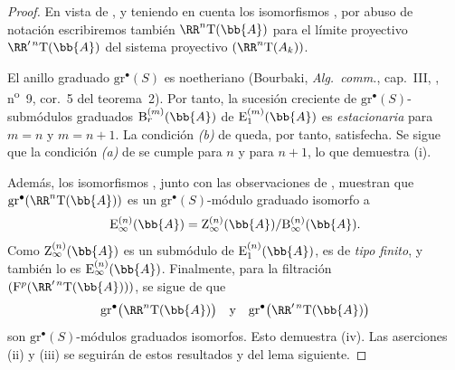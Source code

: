 \documentclass[oneside]{amsart}
\begin{document}
\begin{proof}
En vista de , y teniendo en cuenta los
isomorfismos , por abuso de notación escribiremos también
$\RR^n\mathrm{T}(\bb{A})$ para el límite proyectivo
$\RR'^{\,n}\mathrm{T}(\bb{A})$ del sistema proyectivo
$(\RR^n\mathrm{T}(A_k))$.

El anillo graduado $\mathrm{gr}^\bullet(S)$ es noetheriano
(Bourbaki, \emph{Alg.\ comm.}, cap.~III, ,
n\textsuperscript{o}~9, cor.~5 del teorema~2).
Por tanto, la sucesión creciente de
$\mathrm{gr}^\bullet(S)$-submódulos graduados
$\mathrm{B}_r^{(m)}(\bb{A})$ de
$\mathrm{E}_1^{(m)}(\bb{A})$ es \emph{estacionaria} para $m=n$ y
$m=n+1$.
La condición \emph{(b)} de  queda, por tanto, satisfecha.
Se sigue que la condición \emph{(a)} de  se cumple para
$n$ y para $n+1$, lo que demuestra {\rm(i)}.

Además, los isomorfismos , junto con las
observaciones de , muestran que
$\mathrm{gr}^\bullet(\RR^n\mathrm{T}(\bb{A}))$ es un
$\mathrm{gr}^\bullet(S)$-módulo graduado isomorfo a
\[
  \mathrm{E}_\infty^{(n)}(\bb{A})
  =
  \mathrm{Z}_\infty^{(n)}(\bb{A})
  /
  \mathrm{B}_\infty^{(n)}(\bb{A}).
\]
Como $\mathrm{Z}_\infty^{(n)}(\bb{A})$ es un submódulo de
$\mathrm{E}_1^{(n)}(\bb{A})$, es de \emph{tipo finito}, y también lo es
$\mathrm{E}_\infty^{(n)}(\bb{A})$.
Finalmente, para la filtración
$(\mathrm{F}^p(\RR'^{\,n}\mathrm{T}(\bb{A})))$, se sigue de
 que
\[
  \mathrm{gr}^\bullet\bigl(\RR^n\mathrm{T}(\bb{A})\bigr)
  \quad\hbox{y}\quad
  \mathrm{gr}^\bullet\bigl(\RR'^{\,n}\mathrm{T}(\bb{A})\bigr)
\]
son $\mathrm{gr}^\bullet(S)$-módulos graduados isomorfos.
Esto demuestra {\rm(iv)}.
Las aserciones {\rm(ii)} y {\rm(iii)} se seguirán de estos resultados
y del lema siguiente.
\end{proof}
\end{document}
